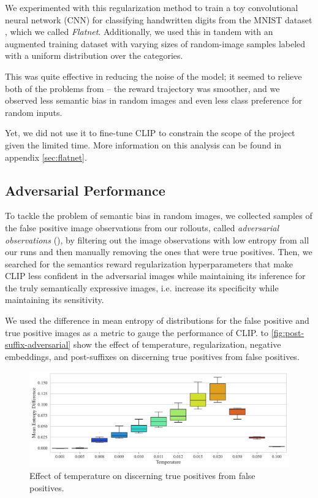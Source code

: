 We experimented with this regularization method to train a toy convolutional neural network (CNN) for classifying handwritten digits from the MNIST dataset \citep{mnist}, which we called \emph{Flatnet}.
Additionally, we used this in tandem with an augmented training dataset with varying sizes of random-image samples labeled with a uniform distribution over the categories.

This was quite effective in reducing the noise of the model; it seemed to relieve both of the problems from  -- the reward trajectory was smoother, and we observed less semantic bias in random images and even less class preference for random inputs.

Yet, we did not use it to fine-tune CLIP to constrain the scope of the project given the limited time.
More information on this analysis can be found in appendix \ref{sec:flatnet}.

\subsection{Adversarial Performance}
\label{sec:adversarial-performance}
To tackle the problem of semantic bias in random images, we collected samples of the false positive image observations from our rollouts, called \emph{adversarial observations} (), by filtering out the image observations with low entropy from all our runs and then manually removing the ones that were true positives.
Then, we searched for the semantics reward regularization hyperparameters that make CLIP less confident in the adversarial images while maintaining its inference for the truly semantically expressive images, i.e. increase its specificity while maintaining its sensitivity.

We used the difference in mean entropy of distributions for the false positive and true positive images as a metric to gauge the performance of CLIP.
 to \ref{fig:post-suffix-adversarial} show the effect of temperature, regularization, negative embeddings, and post-suffixes on discerning true positives from false positives.

\begin{figure}[h]
    \centering
    \includegraphics[width=\textwidth]{images/temperature_adversarial.pdf}
    \caption{Effect of temperature on discerning true positives from false positives.}
    \label{fig:clip-temperature-adversarial}
\end{figure}

